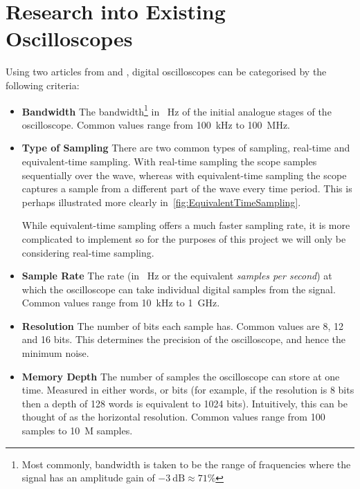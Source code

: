 \section{Research into Existing Oscilloscopes}

Using two articles from \autocite{PicotechScopes} and
\autocite{GabotronicsScopes}, digital
oscilloscopes can be categorised by the following criteria:

\begin{itemize}

  \item \textbf{Bandwidth} The bandwidth\footnote{Most commonly, bandwidth is
      taken to be the range of fraquencies where the signal has an amplitude
      gain of $\SI{-3}{\dB}\approx 71\%$} in \SI{}{\Hz} of the initial analogue
      stages of the oscilloscope. Common values range from \SI{100}{\kHz} to
      \SI{100}{\MHz}.

  \item \textbf{Type of Sampling} There are two common types of sampling,
    real-time and equivalent-time sampling. With real-time sampling the scope
    samples sequentially over the wave, whereas with equivalent-time sampling
    the scope captures a sample from a different part of the wave every time
    period. This is perhaps illustrated more clearly
    in~\cref{fig:EquivalentTimeSampling}.

  While equivalent-time sampling offers a much faster sampling rate, it is more
  complicated to implement so for the purposes of this project we will only be
  considering real-time sampling.

  \item \textbf{Sample Rate} The rate (in \SI{}{\Hz} or the equivalent
  \textit{samples per second}) at which the oscilloscope can take individual
  digital samples from the signal. Common values range from \SI{10}{\kHz} to
  \SI{1}{\GHz}.

  \item \textbf{Resolution} The number of bits each sample has. Common values
  are 8, 12 and 16 bits. This determines the precision of the oscilloscope, and
  hence the minimum noise.

  \item \textbf{Memory Depth} The number of samples the oscilloscope can store
  at one time. Measured in either words, or bits (for example, if the resolution
  is 8 bits then a depth of 128 words is equivalent to 1024 bits). Intuitively,
  this can be thought of as the horizontal resolution. Common values range from
  100 samples to \SI{10}{M} samples.


\end{itemize}
